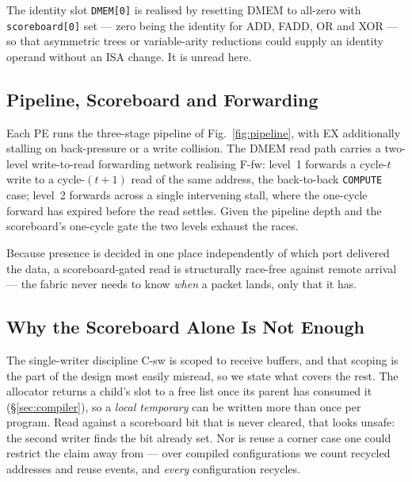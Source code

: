 \documentclass[journal,10pt]{IEEEtran}
\theoremstyle{plain}
\theoremstyle{definition}
\theoremstyle{remark}
\begin{document}
The identity slot \texttt{DMEM[0]} is realised by resetting DMEM to all-zero
with \texttt{scoreboard[0]} set --- zero being the identity for ADD, FADD, OR
and XOR --- so that asymmetric trees or variable-arity reductions could supply
an identity operand without an ISA change. It is unread here.

\subsection{Pipeline, Scoreboard and Forwarding}\label{sec:fabric-pipe}

Each PE runs the three-stage pipeline of Fig.~\ref{fig:pipeline}, with
\textsf{EX} additionally stalling on back-pressure or a write collision. The
DMEM read path carries a
two-level write-to-read forwarding network realising \textsf{F-fw}: level~1
forwards a cycle-$t$ write to a cycle-$(t{+}1)$ read of the same address, the
back-to-back \texttt{COMPUTE} case; level~2 forwards across a single
intervening stall, where the one-cycle forward has expired before the read
settles. Given the pipeline depth and the scoreboard's one-cycle gate the two
levels exhaust the races.

Because presence is decided in one place
independently of which port delivered the data, a scoreboard-gated read is
structurally race-free against remote arrival --- the fabric never needs to
know \emph{when} a packet lands, only that it has.

\subsection{Why the Scoreboard Alone Is Not Enough}\label{sec:fabric-recycle}

The single-writer discipline \textsf{C-sw} is scoped to receive buffers, and
that scoping is the part of the design most easily misread, so we state what
covers the rest. The allocator returns a child's slot to a free list once its
parent has consumed it (\S\ref{sec:compiler}), so a \emph{local temporary}
can be written more than once per program. Read against a scoreboard bit that
is never cleared, that looks unsafe: the second writer finds the bit already
set. Nor is reuse a corner case one could restrict the claim away from --- over
\RecycleConfigs{} compiled configurations we count \RecycleAddrs{} recycled
addresses and \RecycleEvents{} reuse events, and \emph{every} configuration
recycles.
\end{document}
